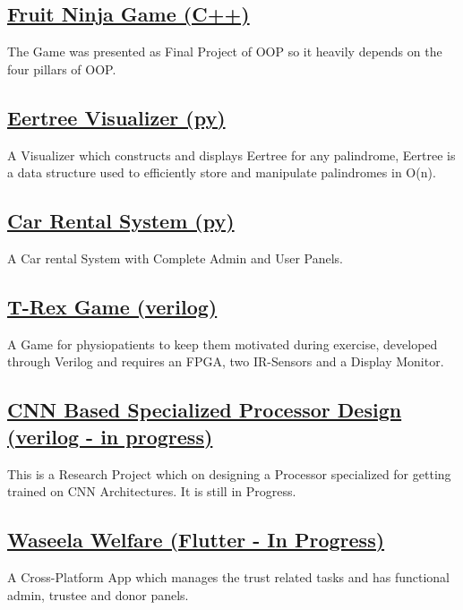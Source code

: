\documentclass[]{plushcv}
\begin{document}
\begin{minipage}[t]{0.30\textwidth}
    \subsection{\href{https://github.com/smabbasht/CS224-OOP-FruitNinjaGame-cpp}{\textbf{Fruit Ninja Game (C++)}}}
    The Game was presented as Final Project of OOP so it heavily depends on the four pillars of OOP.

    \subsection{\href{https://github.com/smabbasht/CS201-DataSructures-II-Project-eertree}{\textbf{Eertree Visualizer (py)}}}
    A Visualizer which constructs and displays Eertree for any palindrome, Eertree is a data structure used to efficiently store and manipulate palindromes in O(n). 

    \subsection{\href{https://github.com/smabbasht/HU-DSA-Project}{\textbf{Car Rental System (py)}}}
    A Car rental System with Complete Admin and User Panels.

    \subsection{\href{https://github.com/smabbasht/CS370-DIgital-Logic-Design-Project}{\textbf{T-Rex Game (verilog)}}}
    A Game for physiopatients to keep them motivated during exercise, developed through Verilog and requires an FPGA, two IR-Sensors and a Display Monitor.
    
    \subsection{\href{https://github.com/smabbasht/CS330-ResearchProject-ComputerArchitecture}{CNN Based Specialized Processor Design (verilog - in progress)}}
    This is a Research Project which on designing a Processor specialized for getting trained on CNN Architectures. It is still in Progress.

    \subsection{\href{https://github.com/smabbasht/Waseela-Welfare}{\textbf{Waseela Welfare (Flutter -  In Progress)}}}
    A Cross-Platform App which manages the trust related tasks and has functional admin, trustee and donor panels.
 


\end{minipage} 
\end{document}
